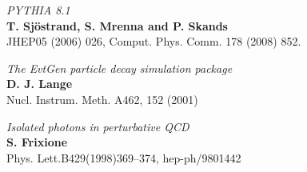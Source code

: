 \documentclass[11pt,a4paper,final]{report}
\begin{document}
\begin{thebibliography}{9}
	\textit{PYTHIA 8.1}\\
	\textbf{T. Sjöstrand, S. Mrenna and P. Skands}\\
	JHEP05 (2006) 026, Comput. Phys. Comm. 178 (2008) 852. 
	
	\textit{The EvtGen particle decay simulation package}\\
	\textbf{D. J. Lange}\\
	Nucl. Instrum. Meth. A462, 152 (2001)
	
	\textit{Isolated photons in perturbative QCD}\\	
	\textbf{S. Frixione}\\
	Phys. Lett.B429(1998)369–374, hep-ph/9801442
	
	
\end{thebibliography}
\end{document}
